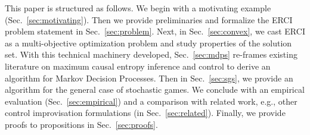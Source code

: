  This paper is structured as follows. We begin with a
motivating example (Sec.~\ref{sec:motivating}). Then we provide
preliminaries and formalize the ERCI problem statement in
Sec.~\ref{sec:problem}. Next, in Sec.~\ref{sec:convex}, we cast ERCI
as a multi-objective optimization problem and study properties of the
solution set. With this technical machinery developed,
Sec.~\ref{sec:mdps} re-frames existing literature on maximum causal
entropy inference and control to derive an algorithm for Markov
Decision Processes.  Then in Sec.~\ref{sec:sgs}, we provide an
algorithm for the general case of stochastic games. We conclude with
an empirical evaluation (Sec.~\ref{sec:empirical}) and a comparison
with related work, e.g., other control improvisation
formulations (in Sec.~\ref{sec:related}). Finally, we provide proofs
to propositions in Sec.~\ref{sec:proofs}.



